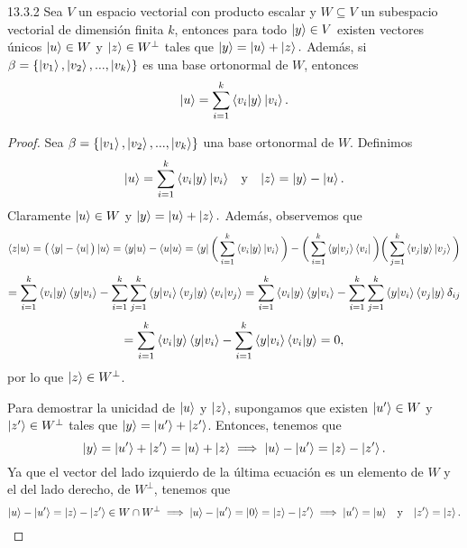 \documentclass[12pt,libertine]{book}
\begin{document}
\begin{Teo} {13.3.2}
    Sea $V$ un espacio vectorial con producto escalar y $W\subseteq V$ un subespacio vectorial de dimensión finita $k$, entonces para todo $\ket{y}\in V$ existen vectores únicos $\ket{u}\in W$ y $\ket{z}\in W^{\perp}$ tales que $\ket{y}=\ket{u}+\ket{z}.$ Además, si $\beta=\{\ket{v_1},\ket{v_2},...,\ket{v_k}\}$ es una base ortonormal de $W$, entonces $$\ket{u}=\sum_{i=1}^k \braket{v_i|y}\ket{v_i}.$$
    \begin{proof}
        Sea $\beta=\{\ket{v_1},\ket{v_2},...,\ket{v_k}\}$ una base ortonormal de $W$. Definimos \[
            \ket{u}=\sum_{i=1}^k\braket{v_i|y}\ket{v_i}\hspace{3mm}\text{y}\hspace{3mm}\ket{z}=\ket{y}-\ket{u}
        .\] \noindent Claramente $\ket{u}\in W$ y $\ket{y}=\ket{u}+\ket{z}.$ Además, observemos que \[
        \braket{z|u}=\big(\bra{y}-\bra{u}\big)\ket{u}=\braket{y|u}-\braket{u|u}=\bra{y}\bigg(\sum_{i=1}^k\braket{v_i|y}\ket{v_i}\bigg)-\bigg(\sum_{i=1}^k\braket{y|v_j}\bra{v_i}\bigg)\bigg(\sum_{j=1}^k \braket{v_j|y}\ket{v_j}\bigg)\] \[
    = \sum_{i=1}^k\braket{v_i|y}\braket{y|v_i}-\sum_{i=1}^k\sum_{j=1}^k\braket{y|v_i}\braket{v_j|y}\braket{v_i|v_j}=\sum_{i=1}^k\braket{v_i|y}\braket{y|v_i}-\sum_{i=1}^k\sum_{j=1}^k\braket{y|v_i}\braket{v_j|y}\delta_{ij}\] \[=\sum_{i=1}^k\braket{v_i|y}\braket{y|v_i}-\sum_{i=1}^k\braket{y|v_i}\braket{v_i|y}=0
,\] \noindent por lo que $\ket{z}\in W^{\perp}$. 

\vspace{3mm}
Para demostrar la unicidad de $\ket{u}$ y $\ket{z}$, supongamos que existen $\ket{u'}\in W$ y $\ket{z'}\in W^{\perp}$ tales que $\ket{y}=\ket{u'}+\ket{z'}$. Entonces, tenemos que \[
    \ket{y}=\ket{u'}+\ket{z'}=\ket{u}+\ket{z}\implies \ket{u}-\ket{u'}=\ket{z}-\ket{z'}
.\] \noindent Ya que el vector del lado izquierdo de la última ecuación es un elemento de $W$ y el del lado derecho, de $W^{\perp}$, tenemos que \[
\ket{u}-\ket{u'}=\ket{z}-\ket{z'}\in W\cap W^{\perp} \implies \ket{u}-\ket{u'}=\ket{0}=\ket{z}-\ket{z'}\implies \ket{u'}=\ket{u}\hspace{3mm} \text{y}\hspace{3mm} \ket{z'}=\ket{z}
.\] 
    \end{proof}
\end{Teo}
\end{document}
